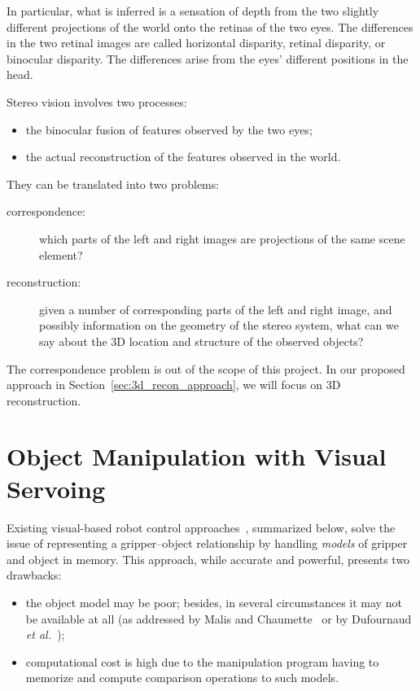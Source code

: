 In particular, what is inferred is a sensation of depth from the two slightly different projections of the world onto the retinas of the two eyes. The differences in the two retinal images are called horizontal disparity, retinal disparity, or binocular disparity. The differences arise from the eyes' different positions in the head.

Stereo vision involves two processes:
\begin{itemize}
\item the binocular fusion of features observed by the two eyes;

\item the actual reconstruction of the features observed in the world.
\end{itemize}

They can be translated into two problems:
\begin{description}
\item[correspondence:] which parts of the left and right images are projections of the same scene element?

\item[reconstruction:] given a number of corresponding parts of the left and right image, and possibly information on the geometry of the stereo system, what can we say about the 3D location and structure of the observed objects?
\end{description}

The correspondence problem is out of the scope of this project. In our proposed approach in Section~\ref{sec:3d_recon_approach}, we will focus on 3D reconstruction.

\section{Object Manipulation with Visual Servoing}
\label{sec:manipulation}

Existing visual-based robot control approaches~\cite{chaumette:visual1, chaumette:visual2, hutchinson:1996}, summarized below, solve the issue of representing a gripper--object relationship by handling \emph{models} of gripper and object in memory. This approach, while accurate and powerful, presents two drawbacks:
\begin{itemize}
\item the object model may be poor; besides, in several circumstances it may not be available at all (as addressed by Malis and Chaumette~\cite{malis:2002} or by Dufournaud \emph{et al.}~\cite{dufournaud:1998});

\item computational cost is high due to the manipulation program having to memorize and compute comparison operations to such models.
\end{itemize}

